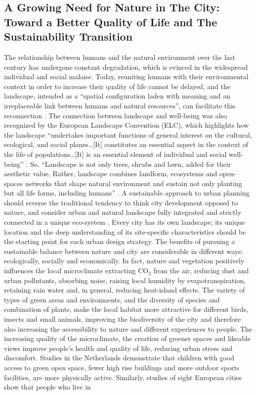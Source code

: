 \documentclass[10pt,a4paper]{article}
\begin{document}
\begin{multicols}{2}

\vspace{\baselineskip}

\section{A Growing Need for Nature in The City: Toward a Better Quality of Life and The Sustainability Transition}
\noindent The relationship between humans and the natural environment over the last century has undergone constant degradation, which is evinced in the widespread individual and social malaise. Today, reuniting humans with their environmental context in order to increase their quality of life cannot be delayed, and the landscape, intended as a ``spatial configuration laden with meaning and an irreplaceable link between humans and natural resources'', can facilitate this reconnection \citep{r12}. The connection between landscape and well-being was also recognized by the European Landscape Convention (ELC), which highlights how the landscape ``undertakes important functions of general interest on the cultural, ecological, and social planes\ldots [It] constitutes an essential aspect in the context of the life of populations\ldots [It] is an essential element of individual and social well-being'' \citep{r13}. So, ``Landscape is not only trees, shrubs and lawn, added for their aesthetic value. Rather, landscape combines landform, ecosystems and open-spaces networks that shape natural environment and sustain not only planting but all life forms, including humans'' \citep{r06, r14}. A sustainable approach to urban planning should reverse the traditional tendency to think city development opposed to nature, and consider urban and natural landscape fully integrated and strictly connected in a unique eco-system \citep{r16, r17}. Every city has its own landscape; its unique location and the deep understanding of its site-specific characteristics should be the starting point for each urban design strategy. The benefits of pursuing a sustainable balance between nature and city are considerable in different ways: ecologically, socially and economically. In fact, nature and vegetation positively influences the local microclimate extracting CO$_2$ from the air, reducing dust and urban pollutants, absorbing noise, raising local humidity by evapotranspiration, retaining rain water and, in general, reducing heat-island effects. The variety of types of green areas and environments, and the diversity of species and combination of plants, make the local habitat more attractive for different birds, insects and small animals, improving the biodiversity of the city and therefore also increasing the accessibility to nature and different experiences to people. The increasing quality of the microclimate, the creation of greener spaces and likeable views improve people’s health and quality of life, reducing urban stress and discomfort. Studies in the Netherlands demonstrate that children with good access to green open space, fewer high rise buildings and more outdoor sports facilities, are more physically active. Similarly, studies of eight European cities show that people who live in 
\end{multicols}
\end{document}
